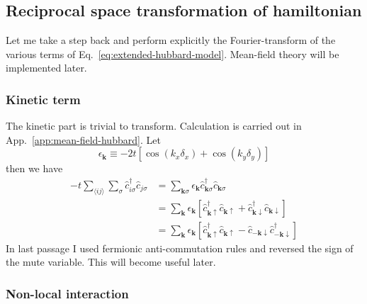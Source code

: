 \subsection{Reciprocal space transformation of hamiltonian}

Let me take a step back and perform explicitly the Fourier-transform of the various terms of Eq.~\ref{eq:extended-hubbard-model}. Mean-field theory will be implemented later.

\subsubsection*{Kinetic term}

The kinetic part is trivial to transform. Calculation is carried out in App.~\ref{app:mean-field-hubbard}. Let
\[
	\epsilon_\mathbf{k} \equiv -2t \left[
		\cos(k_x \delta_x) + \cos(k_y \delta_y)
	\right]
\]
then we have
\[
\begin{aligned}
	-t \sum_{\langle ij \rangle} \sum_\sigma \hat c_{i\sigma}^\dagger \hat c_{j\sigma} &= \sum_{\mathbf{k}\sigma} \epsilon_\mathbf{k} \hat c_{\mathbf{k}\sigma}^\dagger \hat c_{\mathbf{k}\sigma} \\
	&= \sum_\mathbf{k} \epsilon_\mathbf{k} \left[
		\hat c_{\mathbf{k}\uparrow}^\dagger \hat c_{\mathbf{k}\uparrow} + \hat c_{\mathbf{k}\downarrow}^\dagger \hat c_{\mathbf{k}\downarrow}
	\right] \\
	&= \sum_\mathbf{k} \epsilon_\mathbf{k} \left[
		\hat c_{\mathbf{k}\uparrow}^\dagger \hat c_{\mathbf{k}\uparrow}- \hat c_{-\mathbf{k}\downarrow} \hat c_{-\mathbf{k}\downarrow}^\dagger 
	\right]
\end{aligned}
\]
In last passage I used fermionic anti-commutation rules and reversed the sign of the mute variable. This will become useful later.

\subsubsection*{Non-local interaction}

